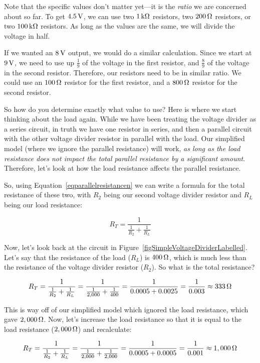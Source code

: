 Note that the specific values don't matter yet---it is the \emph{ratio} we are concerned about so far.
To get $4.5\,\si{\volt}$, we can use two $1\,\si{\kilo\ohm}$ resistors, two $200\,\si{\ohm}$ resistors, or two $100\,\si{\kilo\ohm}$ resistors.
As long as the values are the same, we will divide the voltage in half.

If we wanted an $8\,\si{\volt}$ output, we would do a similar calculation.  
Since we start at $9\,\si{\volt}$, we need to use up $\frac{1}{9}$ of the voltage in the first resistor, and $\frac{8}{9}$ of the voltage in the second resistor.
Therefore, our resistors need to be in similar ratio.
We could use an $100\,\si{\ohm}$ resistor for the first resistor, and a $800\,\si{\ohm}$ resistor for the second resistor.

So how do you determine exactly what value to use?
Here is where we start thinking about the load again.
While we have been treating the voltage divider as a series circuit, in truth we have one resistor in series, and then a parallel circuit with the other voltage divider resistor in parallel with the load.
Our simplified model (where we ignore the parallel resistance) will work, \emph{as long as the load resistance does not impact the total parallel resistance by a significant amount}.
Therefore, let's look at how the load resistance affects the parallel resistance.

So, using Equation~\ref{eqparallelresistancen} we can write a formula for the total resistance of these two, with $R_2$ being our second voltage divider resistor and $R_L$ being our load resistance:

$$ R_T = \frac{1}{\frac{1}{R_2} + \frac{1}{R_L}} $$

Now, let's look back at the circuit in Figure~\ref{figSimpleVoltageDividerLabelled}.
Let's say that the resistance of the load ($R_L$) is $400\,\si{\ohm}$, which is much less than the resistance of the voltage divider resistor ($R_2$).
So what is the total resistance?

$$ R_T = \frac{1}{\frac{1}{R_2} + \frac{1}{R_L}} = \frac{1}{\frac{1}{2,000} + \frac{1}{400}} = \frac{1}{0.0005 + 0.0025} = \frac{1}{0.003} \approx 333\,\si{\ohm} $$

This is way off of our simplified model which ignored the load resistance, which gave $2,000\,\si{\ohm}$.
Now, let's increase the load resistance so that it is equal to the load resistance ($2,000\,\si{\ohm}$) and recalculate:

$$ R_T = \frac{1}{\frac{1}{R_2} + \frac{1}{R_L}} = \frac{1}{\frac{1}{2,000} + \frac{1}{2,000}} = \frac{1}{0.0005 + 0.0005} = \frac{1}{0.001} \approx 1,000\,\si{\ohm} $$

